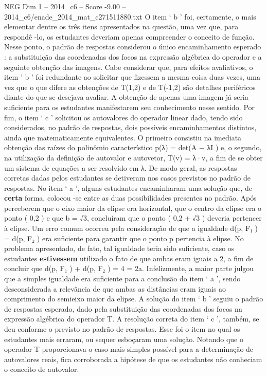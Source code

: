 \begin{textsample}{NEG Dim 1 – 2014\_c6 – Score -9.00 – 2014\_c6/enade\_2014\_mat\_c271511880.txt}
O item ‘ b ’ foi, certamente, o mais elementar dentre os três itens apresentados na questão, uma vez que, para respondê -lo, os estudantes deveriam apenas compreender o conceito de função.
Nesse ponto, o padrão de respostas considerou o único encaminhamento esperado : a substituição das coordenadas dos focos na expressão algébrica do operador e a seguinte obtenção das imagens.
Cabe considerar que, para efeitos avaliativos, o item ’ b ’ foi redundante ao solicitar que fizessem a mesma coisa duas vezes, uma vez que o que difere as obtenções de T(1,2) e de T(-1,2) são detalhes periféricos diante do que se desejava avaliar.
A obtenção de apenas uma imagem já seria suficiente para os estudantes manifestarem seu conhecimento nesse sentido.
Por fim, o item ‘ c ’ solicitou os autovalores do operador linear dado, tendo sido considerados, no padrão de respostas, dois possíveis encaminhamentos distintos, ainda que matematicamente equivalentes.
O primeiro consistiu na imediata obtenção das raízes do polinômio característico p(λ) = det(A − λI ) e, o segundo, na utilização da definição de autovalor e autovetor, T(v) = λ·v, a fim de se obter um sistema de equações a ser resolvido em λ.
De modo geral, as respostas corretas dadas pelos estudantes se detiveram nos casos previstos no padrão de respostas.
No item ‘ a ’, alguns estudantes encaminharam uma solução que, de \textbf{certa} forma, colocou -se entre as duas possibilidades presentes no padrão.
Após perceberem que o eixo maior da elipse era horizontal, que o centro da elipse era o ponto ( 0,2 ) e que b = √3, concluíram que o ponto ( 0,2 + √3 ) deveria pertencer à elipse.
Um erro comum ocorreu pela consideração de que a igualdade d(p, F₁ ) = d(p, F₂ ) era suficiente para garantir que o ponto p pertencia à elipse.
No problema apresentado, de fato, tal igualdade teria sido suficiente, caso os estudantes \textbf{estivessem} utilizado o fato de que ambas eram iguais a 2, a fim de concluir que d(p, F₁ ) + d(p, F₂ ) = 4 = 2a.
Infelizmente, a maior parte julgou que a simples igualdade era suficiente para a conclusão do item ‘ a ’, sendo desconsiderada a relevância de que ambas as distâncias eram iguais ao comprimento do semieixo maior da elipse.
A solução do item ‘ b ’ seguiu o padrão de respostas esperado, dado pela substituição das coordenadas dos focos na expressão algébrica do operador T.
A resolução correta do item ‘ c ’, também, se deu conforme o previsto no padrão de respostas.
Esse foi o item no qual os estudantes mais erraram, ou sequer esboçaram uma solução.
Notando que o operador T proporcionava o caso mais simples possível para a determinação de autovalores reais, fica corroborada a hipótese de que os estudantes não conheciam o conceito de autovalor.

\end{textsample}

